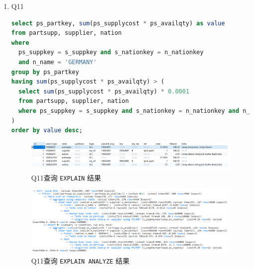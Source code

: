 \documentclass{article}
\renewcommand\tt{\texttt}
\begin{document}
\begin{enumerate}
\item Q11

\begin{lstlisting}[language=sql]
select ps_partkey, sum(ps_supplycost * ps_availqty) as value 
from partsupp, supplier, nation 
where 
  ps_suppkey = s_suppkey and s_nationkey = n_nationkey
  and n_name = 'GERMANY' 
group by ps_partkey 
having sum(ps_supplycost * ps_availqty) > (
  select sum(ps_supplycost * ps_availqty) * 0.0001 
  from partsupp, supplier, nation 
  where ps_suppkey = s_suppkey and s_nationkey = n_nationkey and n_name = 'GERMANY' 
)
order by value desc;
\end{lstlisting}

\begin{figure}[H]
\centering
\includegraphics[width=1\textwidth]{img/21.png}
\caption{Q11查询 \tt{EXPLAIN} 结果}
\end{figure}

\begin{figure}[H]
\centering
\includegraphics[width=1\textwidth]{img/22.png}
\caption{Q11查询 \tt{EXPLAIN ANALYZE} 结果}
\end{figure}


\end{enumerate}
\end{document}

